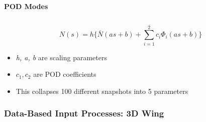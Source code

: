 \documentclass[9pt]{beamer}
\begin{document}
\begin{frame}
\begin{columns}[c]
    {\bf POD Modes}
\end{columns}
\vspace{1cm}
\begin{equation*}
N(s) = h \lbrace \bar{N}(as + b) + \sum_{i=1}^2 c_i \Phi_i(as + b)   \rbrace
\end{equation*}

\begin{itemize}
\item \emph{h, a, b} are scaling parameters
\item $c_1, c_2$ are POD coefficients
\item This collapses 100 different snapshots into 5 parameters
\end{itemize}
\end{frame}
\begin{frame}
\frametitle{Data-Based Input Processes: 3D Wing}
\label{sec-3-4}



\end{frame}
\end{document}
